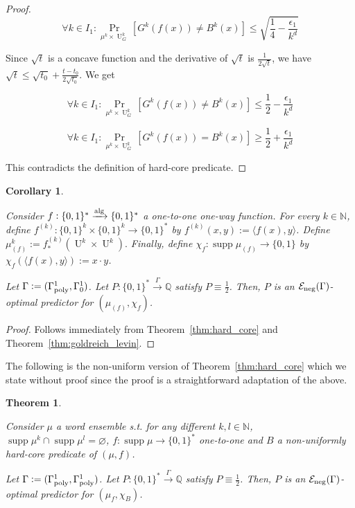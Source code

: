 \documentclass{article}
\numberwithin{equation}{section}
\theoremstyle{definition}
\theoremstyle{plain}
\newtheorem{theorem}{Theorem}[section]
\newtheorem{corollary}{Corollary}[section]
\newcommand{\Bool}{\{0,1\}}
\newcommand{\Words}{{\Bool^*}}
\newcommand{\WordsLen}[1]{{\Bool^{#1}}}
\DeclareMathOperator{\Supp}{supp}
\DeclareMathOperator{\Prb}{Pr}
\DeclareMathOperator{\Un}{U}
\newcommand{\Nats}{\mathbb{N}}
\newcommand{\Rats}{\mathbb{Q}}
\newcommand{\Chev}[1]{\langle #1 \rangle}
\newcommand{\Fall}{\mathcal{E}}
\newcommand{\Alg}{\xrightarrow{\textnormal{alg}}}
\newcommand{\Scheme}{\xrightarrow{\Gamma}}
\begin{document}
\begin{proof}
$$ \forall k \in I_1: \Prb_{\mu^{k} \times \Un_G^k}[G^k(f(x)) \ne B^k(x)] \leq \sqrt{\frac{1}{4} - \frac{\epsilon_1}{k^d}} $$

Since $\sqrt{t}$ is a concave function and the derivative of $\sqrt{t}$ is $\frac{1}{2\sqrt{t}}$, we have $\sqrt{t} \leq \sqrt{t_0} + \frac{t-t_0}{2\sqrt{t_0}}$. We get

$$ \forall k \in I_1: \Prb_{\mu^{k} \times \Un_G^k}[G^k(f(x)) \ne B^k(x)] \leq \frac{1}{2}-\frac{\epsilon_1}{k^d}$$

$$ \forall k \in I_1: \Prb_{\mu^{k} \times \Un_G^k}[G^k(f(x)) = B^k(x)] \geq \frac{1}{2}+\frac{\epsilon_1}{k^d}$$

This contradicts the definition of hard-core predicate.
\end{proof}

\begin{corollary}
\label{crl:one_way}

Consider $f: \Words \Alg \Words$ a one-to-one one-way function. For every $k \in \Nats$, define $f^{(k)}: \WordsLen{k} \times \WordsLen{k} \rightarrow \Words$ by ${f^{(k)}(x,y):=\Chev{f(x),y}}$. Define $\mu_{(f)}^k:=f_*^{(k)}(\Un^k \times \Un^k).$ Finally, define $\chi_f: \Supp \mu_{(f)} \rightarrow \Bool$ by ${\chi_f(\Chev{f(x),y}):=x \cdot y}$.

Let $\Gamma:=(\Gamma_{\textnormal{poly}}^1,\Gamma_0^1)$. Let $P: \Words \Scheme \Rats$ satisfy $P \equiv \frac{1}{2}$. Then, $P$ is an $\Fall_{\textnormal{neg}}(\Gamma)$-optimal predictor for $(\mu_{(f)}, \chi_f)$.

\end{corollary}

\begin{proof}

Follows immediately from Theorem~\ref{thm:hard_core} and Theorem~\ref{thm:goldreich_levin}.
\end{proof}

The following is the non-uniform version of Theorem~\ref{thm:hard_core} which we state without proof since the proof is a straightforward adaptation of the above.

\begin{theorem}
\label{thm:hard_core_circ}

Consider $\mu$ a word ensemble s.t. for any different $k,l \in \Nats$, $\Supp \mu^k \cap \Supp \mu^l = \varnothing$, $f: \Supp \mu \rightarrow \Words$ one-to-one and $B$ a non-uniformly hard-core predicate of $(\mu,f)$. 

Let $\Gamma:=(\Gamma_{\textnormal{poly}}^1,\Gamma_{\textnormal{poly}}^1)$. Let $P: \Words \Scheme \Rats$ satisfy $P \equiv \frac{1}{2}$. Then, $P$ is an $\Fall_{\textnormal{neg}}(\Gamma)$-optimal predictor for $(\mu_f, \chi_B)$.

\end{theorem}
\end{document}
